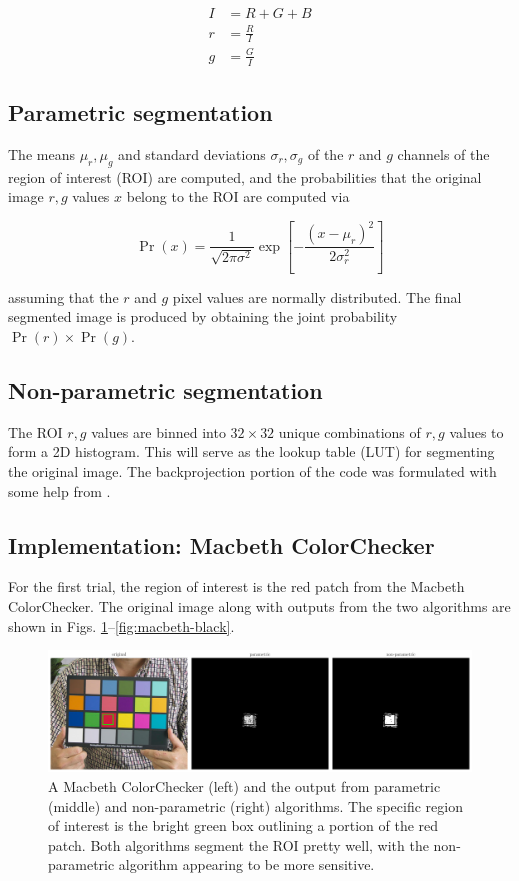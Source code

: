 \documentclass[12pt,a4paper]{article}
\begin{document}
\begin{align}
	I &= R + G + B \label{eq:ncc} \\
	r &= \frac{R}{I} \nonumber \\
	g &= \frac{G}{I} \nonumber
\end{align}

\subsection{Parametric segmentation}
The means $\mu_r, \mu_g$ and standard deviations $\sigma_r, \sigma_g$ of the $r$ and $g$ channels of the region of interest (ROI) are computed, and the probabilities that the original image $r,g$ values $x$ belong to the ROI are computed via

\begin{equation}\label{eq:probability}
	\Pr(x) = \frac{1}{\sqrt{2\pi\sigma^2}} \exp[-\frac{(x - \mu_r)^2}{2\sigma_r^2}]
\end{equation}

\noindent assuming that the $r$ and $g$ pixel values are normally distributed. The final segmented image is produced by obtaining the joint probability $\Pr(r) \times \Pr(g)$.

\subsection{Non-parametric segmentation}
The ROI $r,g$ values are binned into $32 \times 32$ unique combinations of $r,g$ values to form a 2D histogram. This will serve as the lookup table (LUT) for segmenting the original image. The backprojection portion of the code was formulated with some help from \cite{barteezy}.

\subsection{Implementation: Macbeth ColorChecker}
For the first trial, the region of interest is the red patch from the Macbeth ColorChecker. The original image along with outputs from the two algorithms are shown in Figs. \ref{fig:macbeth-red}--\ref{fig:macbeth-black}.

\begin{figure}[htb]
	\centering
	\includegraphics[width=\textwidth]{mac_red_out.png}
	\caption{A Macbeth ColorChecker (left) and the output from parametric (middle) and non-parametric (right) algorithms. The specific region of interest is the bright green box outlining a portion of the red patch. Both algorithms segment the ROI pretty well, with the non-parametric algorithm appearing to be more sensitive.}
	\label{fig:macbeth-red}
\end{figure}
\end{document}
